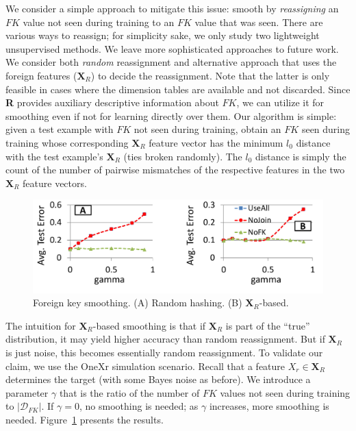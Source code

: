 \documentclass{vldb}
\begin{document}
We consider a simple approach to mitigate this issue: smooth by \textit{reassigning} an $FK$ value not seen during training to an $FK$ value that was
seen. There are various ways to reassign; for simplicity sake, we only study two lightweight unsupervised methods.
We leave more sophisticated approaches to future work.
We consider both \textit{random} reassignment and alternative approach that uses the foreign features ($\textbf{X}_R$) to decide the reassignment. 
Note that the latter is only feasible in cases where the dimension tables are available and not discarded. Since \textbf{R} provides auxiliary 
descriptive information about $FK$, we can utilize it for smoothing even if not for learning directly over them.
Our algorithm is simple: given a test example with $FK$ not seen during training, obtain an $FK$ seen during training whose corresponding 
$\textbf{X}_R$ feature vector has the minimum $l_0$ distance with the test example's $\textbf{X}_R$ (ties broken randomly). The $l_0$ distance is
simply the count of the number of pairwise mismatches of the respective features in the two $\textbf{X}_R$ feature vectors. 

\begin{figure}[t]
\centering
\includegraphics[width=0.99\linewidth]{smoothing.pdf}
\caption{Foreign key smoothing. (A) Random hashing. (B) $\textbf{X}_R$-based.}
\label{Figure:smoothing}
\end{figure}

The intuition for $\textbf{X}_R$-based smoothing is that if $\textbf{X}_R$ is part of the ``true'' distribution, it may yield higher accuracy 
than random reassignment. But if $\textbf{X}_R$ is just noise, this becomes essentially random reassignment.
To validate our claim, we use the OneXr simulation scenario. Recall that a feature $X_r \in \textbf{X}_R$
determines the target (with some Bayes noise as before). We introduce a parameter $\gamma$ that is the ratio of the number of $FK$ values not seen 
during training to $|\mathcal{D}_{FK}|$. If $\gamma = 0$, no smoothing is needed; as $\gamma$ increases, more smoothing is needed.
Figure~\ref{Figure:smoothing} presents the results. 
\end{document}
